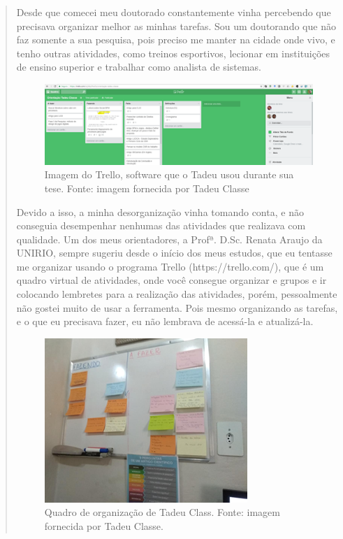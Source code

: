 \begin{quote}
Desde que comecei meu doutorado constantemente vinha percebendo que precisava organizar melhor as minhas tarefas. Sou um doutorando que não faz somente a sua pesquisa, pois preciso me manter na cidade onde vivo, e tenho outras atividades, como treinos esportivos, lecionar em instituições de ensino superior e trabalhar como analista de sistemas.

\begin{figure}[hbt]
	\centering
	\includegraphics[width=0.7\linewidth]{Images/Trello}
	\caption{Imagem do Trello, software que o Tadeu usou durante sua tese. Fonte: imagem fornecida por Tadeu Classe}
	\label{fig:trello}
\end{figure}

Devido a isso, a minha desorganização vinha tomando conta, e não conseguia desempenhar nenhumas das atividades que realizava com qualidade. Um dos meus orientadores, a Profª. D.Sc. Renata Araujo da UNIRIO, sempre sugeriu desde o início dos meus estudos, que eu tentasse me organizar usando o programa Trello (https://trello.com/), que é um quadro virtual de atividades, onde você consegue organizar e grupos e ir colocando lembretes para a realização das atividades, porém, pessoalmente não gostei muito de usar a ferramenta. Pois mesmo organizando as tarefas, e o que eu precisava fazer, eu não lembrava de acessá-la e atualizá-la.

\begin{figure}[hbt]
	\centering
	\includegraphics[width=0.7\linewidth]{Images/quadroorganizacao}
	\caption{Quadro de organização de Tadeu Class. Fonte: imagem fornecida por Tadeu Classe.}
	\label{fig:quadroorganizacao}
\end{figure}


\end{quote}
